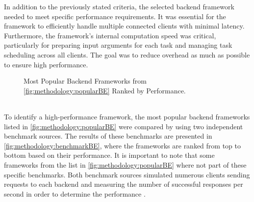 In addition to the previously stated criteria, the selected backend framework needed to meet specific performance requirements. It was essential for the framework to efficiently handle multiple connected clients with minimal latency. Furthermore, the framework's internal computation speed was critical, particularly for preparing input arguments for each task and managing task scheduling across all clients. The goal was to reduce overhead as much as possible to ensure high performance.
\begin{figure}[htbp]
  \myfloatalign
  \caption{Most Popular Backend Frameworks from \autoref{fig:methodology:popularBE} Ranked by Performance.}
  \label{fig:methodology:benchmarkBE}
\end{figure}
~\\
To identify a high-performance framework, the most popular backend frameworks listed in \autoref{fig:methodology:popularBE} were compared by using two independent benchmark sources. The results of these benchmarks are presented in \autoref{fig:methodology:benchmarkBE}, where the frameworks are ranked from top to bottom based on their performance. It is important to note that some frameworks from the list in \autoref{fig:methodology:popularBE} where not part of these specific benchmarks. Both benchmark sources simulated numerous clients sending requests to each backend and measuring the number of successful responses per second in order to determine the performance \cite{backend:benchmark1, backend:benchmark2}.
